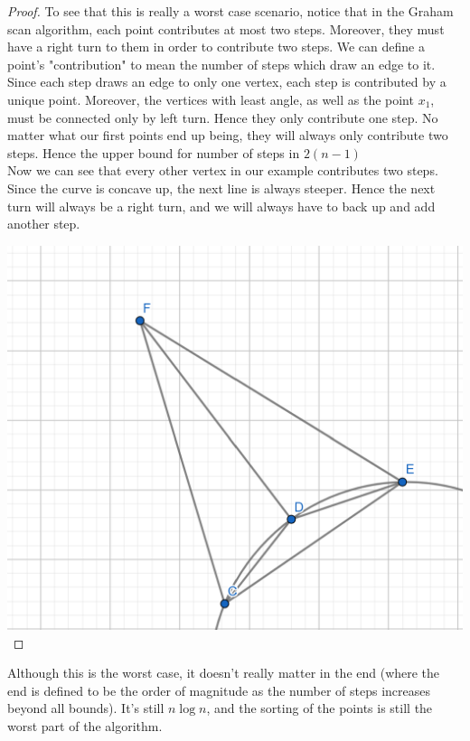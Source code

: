 \documentclass[12pt]{article}
\theoremstyle{definition}
\begin{document}
\begin{proof}
To see that this is really a worst case scenario, notice that in the Graham scan algorithm, each point contributes at most two steps. Moreover, they must have a right turn to them in order to contribute two steps. We can define a point's "contribution" to mean the number of steps which draw an edge to it. Since each step draws an edge to only one vertex, each step is contributed by a unique point. Moreover, the vertices with least angle, as well as the point $x_1$, must be connected only by left turn. Hence they only contribute one step. No matter what our first points end up being, they will always only contribute two steps. Hence the upper bound for number of steps in $2(n-1)$\\

Now we can see that every other vertex in our example contributes two steps. Since the curve is concave up, the next line is always steeper. Hence the next turn will always be a right turn, and we will always have to back up and add another step. 

\includegraphics[scale=0.25]{concave.png} 
\end{proof}

Although this is the worst case, it doesn't really matter in the end (where the end is defined to be the order of magnitude as the number of steps increases beyond all bounds). It's still $n\log n$, and the sorting of the points is still the worst part of the algorithm.
\end{document}
